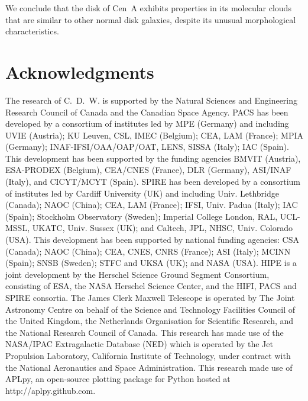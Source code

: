 We conclude that the disk of Cen~A exhibits properties in its molecular clouds that are similar to other normal disk galaxies, despite its unusual morphological characteristics.

\section*{Acknowledgments}
The research of C.~D.~W. is supported by the Natural Sciences and Engineering Research Council of Canada and the Canadian Space Agency.  PACS has been developed by a consortium of institutes led by MPE (Germany) and including UVIE (Austria); KU Leuven, CSL, IMEC (Belgium); CEA, LAM (France); MPIA (Germany); INAF-IFSI/OAA/OAP/OAT, LENS, SISSA (Italy); IAC (Spain). This development has been supported by the funding agencies BMVIT (Austria), ESA-PRODEX (Belgium), CEA/CNES (France), DLR (Germany), ASI/INAF (Italy), and CICYT/MCYT (Spain).  SPIRE has been developed by a consortium of institutes led by Cardiff University (UK) and including Univ. Lethbridge (Canada); NAOC (China); CEA, LAM (France); IFSI, Univ. Padua (Italy); IAC (Spain); Stockholm Observatory (Sweden); Imperial College London, RAL, UCL-MSSL, UKATC, Univ. Sussex (UK); and Caltech, JPL, NHSC, Univ. Colorado (USA). This development has been supported by national funding agencies: CSA (Canada); NAOC (China); CEA, CNES, CNRS (France); ASI (Italy); MCINN (Spain); SNSB (Sweden); STFC and UKSA (UK); and NASA (USA).  HIPE is a joint development by the Herschel Science Ground Segment Consortium, consisting of ESA, the NASA Herschel Science Center, and the HIFI, PACS and SPIRE consortia.  The James Clerk Maxwell Telescope is operated by The Joint Astronomy Centre on behalf of the Science and Technology Facilities Council of the United Kingdom, the Netherlands Organisation for Scientific Research, and the National Research Council of Canada. This research has made use of the NASA/IPAC Extragalactic Database (NED) which is operated by the Jet Propulsion Laboratory, California Institute of Technology, under contract with the National Aeronautics and Space Administration.  This research made use of APLpy, an open-source plotting package for Python hosted at http://aplpy.github.com.


%
%


